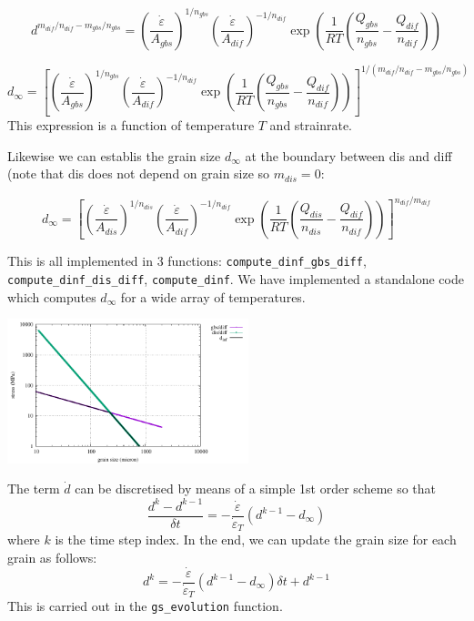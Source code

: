 \documentclass[a4paper]{article}
\begin{document}
\begin{itemize}
\[
d^{m_{dif}/n_{dif}-m_{gbs}/n_{gbs}}
=
\left(\frac{\dot\varepsilon}{A_{gbs}} \right)^{1/n_{gbs}}
\left(\frac{\dot\varepsilon}{A_{dif}}  \right)^{-1/n_{dif}}
\exp\left( \frac{1}{RT}  (\frac{Q_{gbs}}{n_{gbs}} -\frac{Q_{dif}}{n_{dif}}) \right) 
\]


\[
d_\infty
=
\left[\left(\frac{\dot\varepsilon}{A_{gbs}} \right)^{1/n_{gbs}}
\left(\frac{\dot\varepsilon}{A_{dif}}  \right)^{-1/n_{dif}}
\exp\left( \frac{1}{RT}  (\frac{Q_{gbs}}{n_{gbs}} -\frac{Q_{dif}}{n_{dif}}) \right) 
\right]^{1/(m_{dif}/n_{dif}-m_{gbs}/n_{gbs})}
\]
This expression is a function of temperature $T$ and strainrate.

Likewise we can establis the grain size $d_\infty$ at the boundary between dis and diff
(note that dis does not depend on grain size so $m_{dis}=0$:

\[
d_\infty
=
\left[\left(\frac{\dot\varepsilon}{A_{dis}} \right)^{1/n_{dis}}
\left(\frac{\dot\varepsilon}{A_{dif}}  \right)^{-1/n_{dif}}
\exp\left( \frac{1}{RT}  (\frac{Q_{dis}}{n_{dis}} -\frac{Q_{dif}}{n_{dif}}) \right) 
\right]^{n_{dif}/m_{dif}}
\]

This is all implemented in 3 functions:
\lstinline{compute_dinf_gbs_diff},
\lstinline{compute_dinf_dis_diff},
\lstinline{compute_dinf}.
We have implemented a standalone code which computes $d_\infty$ 
for a wide array of temperatures.

\begin{center}
\includegraphics[width=7cm]{images/dinf/dinf.pdf}
\end{center}


\end{itemize}

The term $\dot{d}$ can be discretised by means of a simple 1st order scheme so that 
\[
\frac{d^k -d^{k-1}}{\delta t}=
-\frac{\dot\varepsilon}{\dot\varepsilon_T} (d^{k-1}-d_\infty)
\]
where $k$ is the time step index. In the end, we can update the grain size 
for each grain as follows:
\[
d^k = 
-\frac{\dot\varepsilon}{\dot\varepsilon_T} (d^{k-1}-d_\infty) \delta t + d^{k-1}
\]
This is carried out in the \lstinline{gs_evolution} function.
\end{document}
